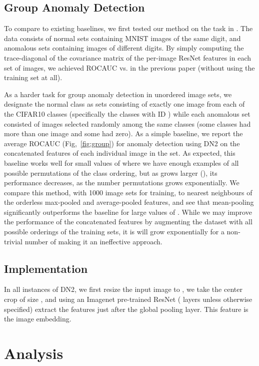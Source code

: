 \documentclass{article}
\begin{document}
\subsection{Group Anomaly Detection}
\label{subsec:exp:group}

To compare to existing baselines, we first tested our method on the task in \citet{dgroup}. The data consists of normal sets containing  MNIST images of the same digit, and anomalous sets containing  images of different digits. By simply computing the trace-diagonal of the covariance matrix of the per-image ResNet features in each set of images, we achieved  ROCAUC vs.  in the previous paper (without using the training set at all). 

As a harder task for group anomaly detection in unordered image sets, we designate the normal class as sets consisting of exactly one image from each of the  CIFAR10 classes (specifically the classes with ID ) while each anomalous set consisted of  images selected randomly among the same classes (some classes had more than one image and some had zero). As a simple baseline, we report the average ROCAUC (Fig,~\ref{fig:group}) for anomaly detection using DN2 on the concatenated features of each individual image in the set. As expected, this baseline works well for small values of  where we have enough examples of all possible permutations of the class ordering, but as  grows larger (), its performance decreases, as the number permutations grows exponentially. We compare this method, with 1000 image sets for training, to nearest neighbours of the orderless max-pooled and average-pooled features, and see that mean-pooling significantly outperforms the baseline for large values of . While we may improve the performance of the concatenated features by augmenting the dataset with all possible orderings of the training sets, it is will grow exponentially for a non-trivial number of  making it an ineffective approach.

\subsection{Implementation}
\label{subsec:exp:imp}

In all instances of DN2, we first resize the input image to , we take the center crop of size , and using an Imagenet pre-trained ResNet ( layers unless otherwise specified) extract the features just after the global pooling layer. This feature is the image embedding.


\section{Analysis}
\label{sec:analysis}
\end{document}
